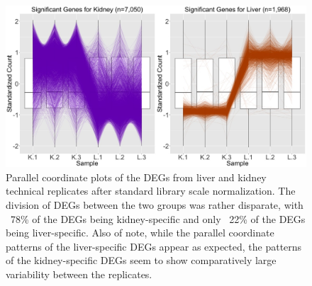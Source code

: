 \documentclass{article}
\begin{document}
\clearpage
\null
\begin{figure}[t!]
\centerline{\includegraphics[width=1\columnwidth]{../Bioinformatics/Pictures/liverKidney/Clustering_data_FDR_001_Raw/Alpha0.1/K_L_Sig.jpg}}
\caption{Parallel coordinate plots of the DEGs from liver and kidney technical replicates after standard library scale normalization. The division of DEGs between the two groups was rather disparate, with ~78\% of the DEGs being kidney-specific and only ~22\% of the DEGs being liver-specific. Also of note, while the parallel coordinate patterns of the liver-specific DEGs appear as expected, the patterns of the kidney-specific DEGs seem to show comparatively large variability between the replicates.
\label{RawKLSig}}
\end{figure}   
\end{document}

